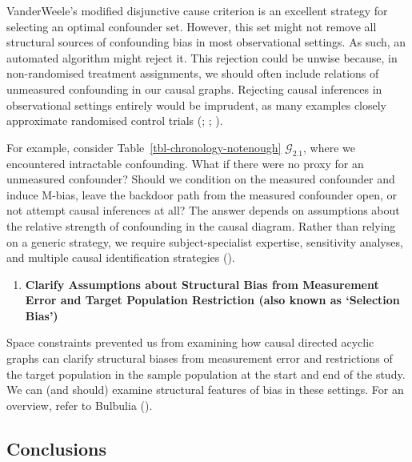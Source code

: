 \documentclass[
  single column]{article}
\providecommand{\tightlist}{%
  \setlength{\itemsep}{0pt}\setlength{\parskip}{0pt}}\usepackage{longtable,booktabs,array}
\begin{document}
VanderWeele's modified disjunctive cause criterion is an excellent
strategy for selecting an optimal confounder set. However, this set
might not remove all structural sources of confounding bias in most
observational settings. As such, an automated algorithm might reject it.
This rejection could be unwise because, in non-randomised treatment
assignments, we should often include relations of unmeasured confounding
in our causal graphs. Rejecting causal inferences in observational
settings entirely would be imprudent, as many examples closely
approximate randomised control trials
(; ;
).

For example, consider Table~\ref{tbl-chronology-notenough}
\(\mathcal{G}_{2.1}\), where we encountered intractable confounding.
What if there were no proxy for an unmeasured confounder? Should we
condition on the measured confounder and induce M-bias, leave the
backdoor path from the measured confounder open, or not attempt causal
inferences at all? The answer depends on assumptions about the relative
strength of confounding in the causal diagram. Rather than relying on a
generic strategy, we require subject-specialist expertise, sensitivity
analyses, and multiple causal identification strategies
().

\begin{enumerate}
\def\labelenumi{\arabic{enumi}.}
\setcounter{enumi}{11}
\tightlist
\item
  \textbf{Clarify Assumptions about Structural Bias from Measurement
  Error and Target Population Restriction (also known as `Selection
  Bias')}
\end{enumerate}

Space constraints prevented us from examining how causal directed
acyclic graphs can clarify structural biases from measurement error and
restrictions of the target population in the sample population at the
start and end of the study. We can (and should) examine structural
features of bias in these settings. For an overview, refer to Bulbulia
().

\subsection{Conclusions}\label{id-sec-6}
\end{document}
